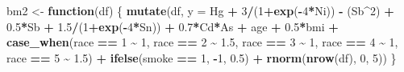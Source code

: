 \documentclass[12pt, twoside]{amherstthesis}
\newenvironment{Shaded}{\begin{snugshade}}{\end{snugshade}}
\newcommand{\AttributeTok}[1]{\textcolor[rgb]{0.13,0.29,0.53}{#1}}
\newcommand{\ControlFlowTok}[1]{\textcolor[rgb]{0.13,0.29,0.53}{\textbf{#1}}}
\newcommand{\DecValTok}[1]{\textcolor[rgb]{0.00,0.00,0.81}{#1}}
\newcommand{\FloatTok}[1]{\textcolor[rgb]{0.00,0.00,0.81}{#1}}
\newcommand{\FunctionTok}[1]{\textcolor[rgb]{0.13,0.29,0.53}{\textbf{#1}}}
\newcommand{\NormalTok}[1]{#1}
\newcommand{\OtherTok}[1]{\textcolor[rgb]{0.56,0.35,0.01}{#1}}
\newcommand{\SpecialCharTok}[1]{\textcolor[rgb]{0.81,0.36,0.00}{\textbf{#1}}}
\begin{document}
\begin{Shaded}
\begin{Highlighting}[]
\NormalTok{bm2 }\OtherTok{\textless{}{-}} \ControlFlowTok{function}\NormalTok{(df) \{}
  \FunctionTok{mutate}\NormalTok{(df, }\AttributeTok{y =} 
\NormalTok{           Hg }\SpecialCharTok{+} \DecValTok{3}\SpecialCharTok{/}\NormalTok{(}\DecValTok{1}\SpecialCharTok{+}\FunctionTok{exp}\NormalTok{(}\SpecialCharTok{{-}}\DecValTok{4}\SpecialCharTok{*}\NormalTok{Ni)) }\SpecialCharTok{{-}}\NormalTok{ (Sb}\SpecialCharTok{\^{}}\DecValTok{2}\NormalTok{) }\SpecialCharTok{+} \FloatTok{0.5}\SpecialCharTok{*}\NormalTok{Sb }\SpecialCharTok{+} \FloatTok{1.5}\SpecialCharTok{/}\NormalTok{(}\DecValTok{1}\SpecialCharTok{+}\FunctionTok{exp}\NormalTok{(}\SpecialCharTok{{-}}\DecValTok{4}\SpecialCharTok{*}\NormalTok{Sn)) }\SpecialCharTok{+} 
           \FloatTok{0.7}\SpecialCharTok{*}\NormalTok{Cd}\SpecialCharTok{*}\NormalTok{As }\SpecialCharTok{+} 
\NormalTok{           age }\SpecialCharTok{+} \FloatTok{0.5}\SpecialCharTok{*}\NormalTok{bmi }\SpecialCharTok{+} 
           \FunctionTok{case\_when}\NormalTok{(race }\SpecialCharTok{==} \DecValTok{1} \SpecialCharTok{\textasciitilde{}} \DecValTok{1}\NormalTok{, }
\NormalTok{                     race }\SpecialCharTok{==} \DecValTok{2} \SpecialCharTok{\textasciitilde{}} \FloatTok{1.5}\NormalTok{, }
\NormalTok{                     race }\SpecialCharTok{==} \DecValTok{3} \SpecialCharTok{\textasciitilde{}} \DecValTok{1}\NormalTok{, }
\NormalTok{                     race }\SpecialCharTok{==} \DecValTok{4} \SpecialCharTok{\textasciitilde{}} \DecValTok{1}\NormalTok{, }
\NormalTok{                     race }\SpecialCharTok{==} \DecValTok{5} \SpecialCharTok{\textasciitilde{}} \FloatTok{1.5}\NormalTok{) }\SpecialCharTok{+}
           \FunctionTok{ifelse}\NormalTok{(smoke }\SpecialCharTok{==} \DecValTok{1}\NormalTok{, }\SpecialCharTok{{-}}\DecValTok{1}\NormalTok{, }\FloatTok{0.5}\NormalTok{) }\SpecialCharTok{+}
           \FunctionTok{rnorm}\NormalTok{(}\FunctionTok{nrow}\NormalTok{(df), }\DecValTok{0}\NormalTok{, }\DecValTok{5}\NormalTok{))}
\NormalTok{\}}


\end{Highlighting}
\end{Shaded}
\end{document}
